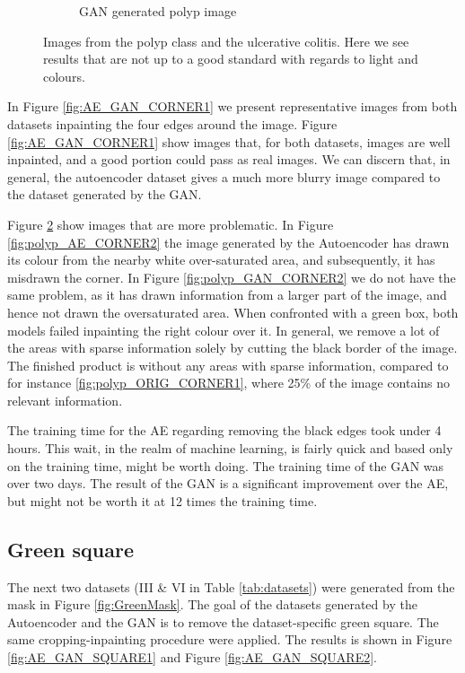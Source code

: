 \begin{figure}
\begin{subfigure}[t]{\myfigsizethree}
            \caption{GAN generated polyp image}   
            \label{fig:z_GAN_CORNER2}
        \end{subfigure}
        \caption{Images from the polyp class and the ulcerative colitis. Here we see results that are not up to a good standard with regards to light and colours.} 
        \label{fig:AE_GAN_CORNER2}
\end{figure}
    
In Figure \ref{fig:AE_GAN_CORNER1} we present representative images from both datasets inpainting the four edges around the image. Figure \ref{fig:AE_GAN_CORNER1} show images that, for both datasets, images are well inpainted, and a good portion could pass as real images. We can discern that, in general, the autoencoder dataset gives a much more blurry image compared to the dataset generated by the GAN. 

Figure \ref{fig:AE_GAN_CORNER2} show images that are more problematic. In Figure \ref{fig:polyp_AE_CORNER2} the image generated by the Autoencoder has drawn its colour from the nearby white over-saturated area, and subsequently, it has misdrawn the corner. In Figure \ref{fig:polyp_GAN_CORNER2} we do not have the same problem, as it has drawn information from a larger part of the image, and hence not drawn the oversaturated area.
When confronted with a green box, both models failed inpainting the right colour over it. 
In general, we remove a lot of the areas with sparse information solely by cutting the black border of the image. The finished product is without any areas with sparse information, compared to for instance \ref{fig:polyp_ORIG_CORNER1}, where 25\% of the image contains no relevant information. 

\vspace{5px}
\noindent The training time for the AE regarding removing the black edges took under 4 hours. This wait, in the realm of machine learning, is fairly quick and based only on the training time, might be worth doing.
The training time of the GAN was over two days. The result of the GAN is a significant improvement over the AE, but might not be worth it at 12 times the training time. 


\FloatBarrier
\subsection{Green square}
The next two datasets (III \& VI in Table \ref{tab:datasets}) were generated from the mask in Figure \ref{fig:GreenMask}.  The goal of the datasets generated by the Autoencoder and the GAN is to remove the dataset-specific green square. The same cropping-inpainting procedure were applied. The results is shown in Figure \ref{fig:AE_GAN_SQUARE1} and Figure \ref{fig:AE_GAN_SQUARE2}.


